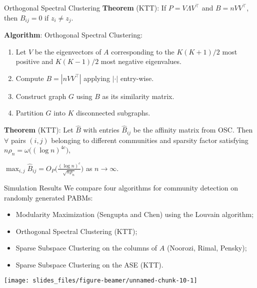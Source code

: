 \documentclass[
  ignorenonframetext,
]{beamer}
\providecommand{\tightlist}{%
  \setlength{\itemsep}{0pt}\setlength{\parskip}{0pt}}
\begin{document}
\begin{frame}{Orthogonal Spectral Clustering}
\protect\hypertarget{orthogonal-spectral-clustering}{}
\textbf{Theorem} (KTT): If \(P = V \Lambda V^\top\) and
\(B = n V V^\top\),\\
then \(B_{ij} = 0\) if \(z_i \neq z_j\).

\textbf{Algorithm}: Orthogonal Spectral Clustering:

\begin{enumerate}
\tightlist
\item
  Let \(V\) be the eigenvectors of \(A\) corresponding to the
  \(K (K+1)/2\) most positive and \(K (K-1) / 2\) most negative
  eigenvalues.
\item
  Compute \(B = |n V V^\top|\) applying \(|\cdot|\) entry-wise.
\item
  Construct graph \(G\) using \(B\) as its similarity matrix.
\item
  Partition \(G\) into \(K\) disconnected subgraphs.
\end{enumerate}

\textbf{Theorem} (KTT): Let \(\hat{B}\) with entries \(\hat{B}_{ij}\) be
the affinity matrix from OSC. Then \(\forall\) pairs \((i, j)\)
belonging to different communities and sparsity factor satisfying
\(n \rho_n = \omega\big((\log n)^{4c}\big)\),

\(\max_{i, j} \hat{B}_{ij} = O_P \Big( \frac{(\log n)^c}{\sqrt{n \rho_n}} \Big)\)
as \(n \to \infty\).
\end{frame}

\begin{frame}{Simulation Results}
\protect\hypertarget{simulation-results}{}
We compare four algorithms for community detection on randomly generated
PABMs:

\begin{itemize}
\tightlist
\item
  Modularity Maximization (Sengupta and Chen) using the Louvain
  algorithm;
\item
  Orthogonal Spectral Clustering (KTT);
\item
  Sparse Subspace Clustering on the columns of \(A\) (Noorozi, Rimal,
  Pensky);
\item
  Sparse Subspace Clustering on the ASE (KTT).
\end{itemize}

\begin{center}\texttt{[image: slides\_files/figure-beamer/unnamed-chunk-10-1]} \end{center}
\end{frame}
\end{document}
